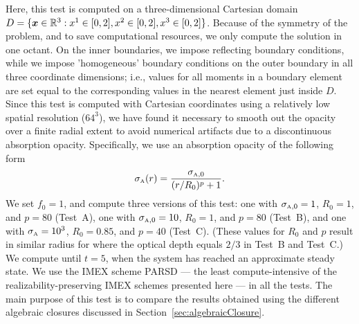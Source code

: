 Here, this test is computed on a three-dimensional Cartesian domain $D=\{\boldsymbol{x}\in\mathbb{R}^{3}:x^{1}\in[0,2], x^{2}\in[0,2], x^{3}\in[0,2]\}$.  
Because of the symmetry of the problem, and to save computational resources, we only compute the solution in one octant.  
On the inner boundaries, we impose reflecting boundary conditions, while we impose 'homogeneous' boundary conditions on the outer boundary in all three coordinate dimensions; i.e., values for all moments in a boundary element are set equal to the corresponding values in the nearest element just inside $D$.  
Since this test is computed with Cartesian coordinates using a relatively low spatial resolution ($64^{3}$), we have found it necessary to smooth out the opacity over a finite radial extent to avoid numerical artifacts due to a discontinuous absorption opacity.  
Specifically, we use an absorption opacity of the following form
\begin{equation}
  \sigma_{\mbox{\tiny A}}(r)=\frac{\sigma_{\mbox{\tiny A},0}}{(r/R_{0})^{p}+1}.  
\end{equation}
We set $f_{0}=1$, and compute three versions of this test: one with $\sigma_{\mbox{\tiny A},0}=1$, $R_{0}=1$, and $p=80$ (Test~A), one with $\sigma_{\mbox{\tiny A},0}=10$, $R_{0}=1$, and $p=80$ (Test~B), and one with $\sigma_{\mbox{\tiny A}}=10^{3}$, $R_{0}=0.85$, and $p=40$ (Test~C).  
(These values for $R_{0}$ and $p$ result in similar radius for where the optical depth equals $2/3$ in Test~B and Test~C.)
We compute until $t=5$, when the system has reached an approximate steady state.  
We use the IMEX scheme PARSD --- the least compute-intensive of the realizability-preserving IMEX schemes presented here --- in all the tests.  
The main purpose of this test is to compare the results obtained using the different algebraic closures discussed in Section~\ref{sec:algebraicClosure}.  

